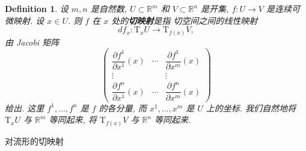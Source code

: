 \documentclass{article}
\newtheorem{definition}{Definition}[subsection]
\begin{document}
\begin{definition}
    \label{特殊定义}
    设 $m, n$ 是自然数, $U \subset \mathbb{R}^m$ 和 $V \subset \mathbb{R}^n$ 是开集, 
    $f \colon U \to V$ 是连续可微映射.
    设 $x \in U$.
    则 $f$ 在 $x$ 处的\textbf{切映射}是指
    切空间之间的线性映射
    \[
        df_x \colon \mathrm{T}_x U \longrightarrow \mathrm{T}_{f (x)} V,
    \]
    由 Jacobi 矩阵
    \[ \begin{pmatrix}
        \dfrac{\partial f^1}{\partial x^1} (x) & \cdots &
        \dfrac{\partial f^1}{\partial x^m} (x) \\
        \vdots & & \vdots \\
        \dfrac{\partial f^n}{\partial x^1} (x) & \cdots &
        \dfrac{\partial f^n}{\partial x^m} (x)
    \end{pmatrix} \]
    给出. 这里 $f^1, \dotsc, f^n$ 是 $f$ 的各分量,
    而 $x^1, \dotsc, x^m$ 是 $U$ 上的坐标.
    我们自然地将 $\mathrm{T}_x U$ 与 $\mathbb{R}^m$ 等同起来,
    将 $\mathrm{T}_{f (x)} V$ 与 $\mathbb{R}^n$ 等同起来.
\end{definition}


对流形的切映射
\end{document}
